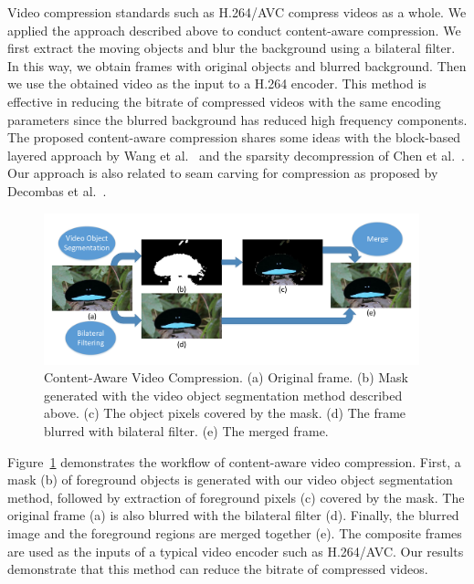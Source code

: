 Video compression standards such as H.264/AVC compress videos as a whole. We applied the approach described above to conduct content-aware compression. We first extract the moving objects and blur the background using a bilateral filter. In this way, we obtain frames with original objects and blurred background. Then we use the obtained video as the input to a H.264 encoder. This method is effective in reducing the bitrate of compressed videos with the same encoding parameters since the blurred background has reduced high frequency components.
The proposed content-aware compression shares some ideas with the block-based layered approach by Wang et al.~\cite{wang2012} and the sparsity decompression of Chen et al.~\cite{Chen2015}. Our approach is also related to seam carving for compression as proposed by Decombas et al.~\cite{decombas2012}.

\begin{figure}
	\centering
	\includegraphics[width=0.97\textwidth]{figures/compression_workflow.pdf}
	\caption{Content-Aware Video Compression. (a) Original frame. (b) Mask generated with the video object segmentation method described above. (c) The object pixels covered by the mask. (d) The frame blurred with bilateral filter. (e) The merged frame.} 
	\label{fig-comp-wf}
\end{figure}

Figure~\ref{fig-comp-wf} demonstrates the workflow of content-aware video compression. First, a mask (b) of foreground objects is generated with our video object segmentation method, followed by extraction of foreground pixels (c) covered by the mask. The original frame (a) is also blurred with the bilateral filter (d). Finally, the blurred image and the foreground regions are merged together (e). The composite frames are used as the inputs of a typical video encoder such as H.264/AVC. Our results demonstrate that this method can reduce the bitrate of compressed videos.

